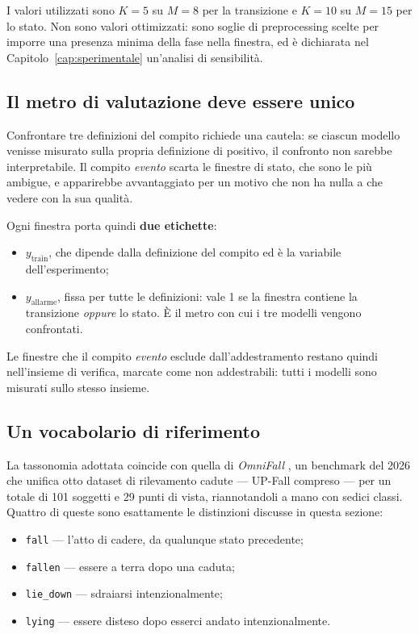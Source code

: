 I valori utilizzati sono $K = 5$ su $M = 8$ per la transizione e $K = 10$ su
$M = 15$ per lo stato. Non sono valori ottimizzati: sono soglie di
preprocessing scelte per imporre una presenza minima della fase nella finestra,
ed è dichiarata nel Capitolo~\ref{cap:sperimentale} un'analisi di sensibilità.

\subsection{Il metro di valutazione deve essere unico}

Confrontare tre definizioni del compito richiede una cautela: se ciascun
modello venisse misurato sulla propria definizione di positivo, il confronto non
sarebbe interpretabile. Il compito \emph{evento} scarta le finestre di stato,
che sono le più ambigue, e apparirebbe avvantaggiato per un motivo che non ha
nulla a che vedere con la sua qualità.

Ogni finestra porta quindi \textbf{due etichette}:

\begin{itemize}
    \item $y_{\text{train}}$, che dipende dalla definizione del compito ed è la
          variabile dell'esperimento;
    \item $y_{\text{allarme}}$, fissa per tutte le definizioni: vale 1 se la
          finestra contiene la transizione \emph{oppure} lo stato. È il metro
          con cui i tre modelli vengono confrontati.
\end{itemize}

Le finestre che il compito \emph{evento} esclude dall'addestramento restano
quindi nell'insieme di verifica, marcate come non addestrabili: tutti i modelli
sono misurati sullo stesso insieme.

\subsection{Un vocabolario di riferimento}

La tassonomia adottata coincide con quella di \emph{OmniFall}
\cite{omnifall2025}, un benchmark del 2026 che unifica otto dataset di
rilevamento cadute — UP-Fall compreso — per un totale di 101 soggetti e 29
punti di vista, riannotandoli a mano con sedici classi. Quattro di queste sono
esattamente le distinzioni discusse in questa sezione:

\begin{itemize}
    \item \texttt{fall} --- l'atto di cadere, da qualunque stato precedente;
    \item \texttt{fallen} --- essere a terra dopo una caduta;
    \item \texttt{lie\_down} --- sdraiarsi intenzionalmente;
    \item \texttt{lying} --- essere disteso dopo esserci andato intenzionalmente.
\end{itemize}

